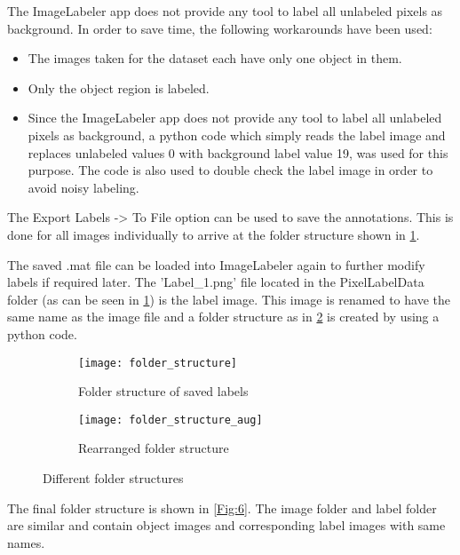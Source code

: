 \documentclass[paper=a4,11pt,parskip=half,toc=listof]{scrartcl}
\begin{document}
The ImageLabeler app does not provide any tool to label all unlabeled pixels as background. In order to save time, the following workarounds have been used:
	\begin{itemize}
		\item The images taken for the dataset each have only one object in them.
		\item Only the object region is labeled.
		\item Since the ImageLabeler app does not provide any tool to label all unlabeled pixels as background, a python code which simply reads the label image and replaces unlabeled values 0 with background label value 19, was used for this purpose. The code is also used to double check the label image in order to avoid noisy labeling.
	\end{itemize}
	
The Export Labels -> To File option can be used to save the annotations. This is done for all images individually to arrive at the folder structure shown in \ref{Fig:5a}.
	
The saved .mat file can be loaded into ImageLabeler again to further modify labels if required later. The 'Label\_1.png' file located in the PixelLabelData folder (as can be seen in \ref{Fig:5a}) is the label image. This image is renamed to have the same name as the image file and a folder structure as in \ref{Fig:5b} is created by using a python code.
	
\begin{center}
	\begin{figure}[!htb]
		\begin{subfigure}{.5\textwidth}
			\centering
			\texttt{[image: folder\_structure]}
			\caption{Folder structure of saved labels}
			\label{Fig:5a}
		\end{subfigure}
		\begin{subfigure}{.5\textwidth}
			\centering
			\texttt{[image: folder\_structure\_aug]}
			\caption{Rearranged folder structure}
			\label{Fig:5b}
		\end{subfigure}
		\caption{Different folder structures}
		\label{Fig:5}
	\end{figure}
\end{center}

The final folder structure is shown in \ref{Fig:6}. The image folder and label folder are similar and contain object images and corresponding label images with same names.
\end{document}
